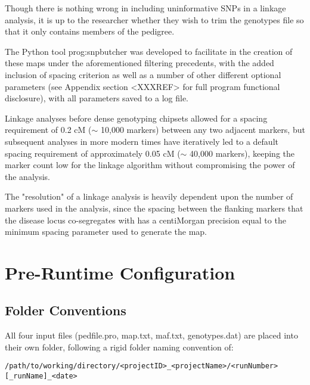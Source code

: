 Though there is nothing wrong in including uninformative SNPs in a linkage analysis, it is up to the researcher whether they wish to trim the genotypes file so that it only contains members of the pedigree.

The Python tool \gls{prog:snpbutcher} was developed to facilitate in the creation of these maps under the aforementioned filtering precedents, with the added inclusion of spacing criterion as well as a number of other different optional parameters (see Appendix section <XXXREF> for full program functional disclosure), with all parameters saved to a log file. 

Linkage analyses before dense genotyping chipsets allowed for a spacing requirement of 0.2 cM ($\sim$ 10,000 markers) between any two adjacent markers, but subsequent analyses in more modern times have iteratively led to a default spacing requirement of approximately 0.05 cM ($\sim$ 40,000 markers), keeping the marker count low for the linkage algorithm without compromising the power of the analysis.

The "resolution" of a linkage analysis is heavily dependent upon the number of markers used in the analysis, since the spacing between the flanking markers that the disease locus co-segregates with has a centiMorgan precision equal to the minimum spacing parameter used to generate the map.



\section{Pre-Runtime Configuration}

\subsection{Folder Conventions}

All four input files (pedfile.pro, map.txt, maf.txt, genotypes.dat) are placed into their own folder, following a rigid folder naming convention of: 

\begin{verbatim}
/path/to/working/directory/<projectID>_<projectName>/<runNumber>[_runName]_<date>
\end{verbatim}

